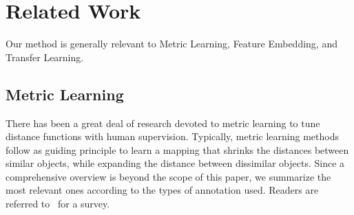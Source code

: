 


\section{Related Work}
\label{sec:rel}

Our method is generally relevant to Metric Learning, Feature
Embedding, and Transfer Learning.

\subsection{Metric Learning}
There has been a great deal of research devoted to metric learning
to tune distance functions  with human supervision. %
Typically, metric learning methods 
follow as guiding principle to learn a mapping that shrinks the
distances between similar objects, while expanding the distance between 
dissimilar objects. 
Since a comprehensive overview is beyond the scope of this paper, we
summarize the most relevant ones according to the types of annotation
used. Readers are referred to~\citep{metric:survey:12}
for a survey.

